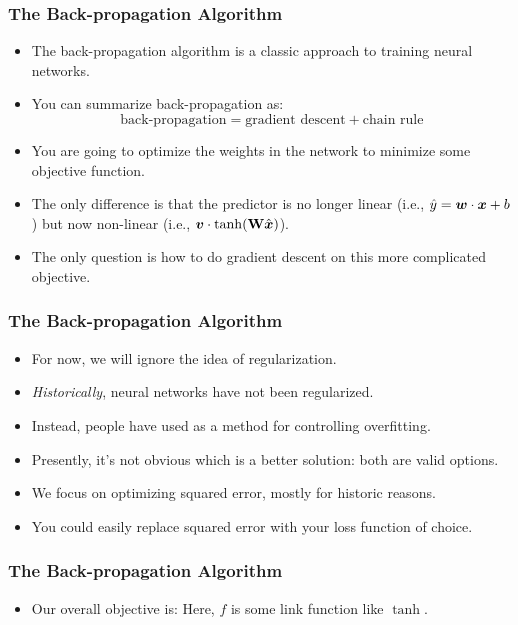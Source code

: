 \documentclass[trans]{beamer}
\begin{document}
\begin{frame}
  \frametitle{The Back-propagation Algorithm}
\begin{itemize}
\item
The back-propagation algorithm is a classic approach to training
neural networks. 
\item You can summarize
back-propagation as:
%
\begin{equation}
\text{back-propagation} = \text{gradient descent} + \text{chain rule}
\end{equation}
%
\item You are going to optimize the weights in the network to minimize some
objective function.
\item  The only difference is that the predictor is no
longer linear (i.e., $\hat y = {\boldsymbol{w}} \cdot {\boldsymbol{x}}+b$) but now non-linear
(i.e., $\boldsymbol{v} \cdot \tanh( \text{\bf W} \hat{{\boldsymbol{x}}} )$).
\item  The only question
is how to do gradient descent on this more complicated objective.
\end{itemize}
\end{frame}

\begin{frame}
  \frametitle{The Back-propagation Algorithm}
\begin{itemize}
\item
For now, we will ignore the idea of regularization.  
\item \emph{Historically}, neural networks have not been
regularized.  
\item Instead, people have used  as a
method for controlling overfitting.  
\item Presently, it's not obvious which
is a better solution: both are valid options.
\item We focus on optimizing squared error, mostly for historic reasons.
\item   You could easily replace
squared error with your loss function of choice.  
\end{itemize}
\end{frame}

\begin{frame}
  \frametitle{The Back-propagation Algorithm}
\begin{itemize}
\item
Our overall
objective is:
%
%
Here, $f$ is some link function like $\tanh$.
\end{itemize}
\end{frame}
\end{document}
